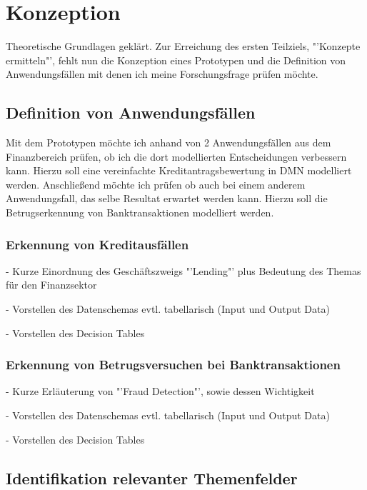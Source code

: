 \chapter{Konzeption}
\label{ch:Konzeption3}

Theoretische Grundlagen geklärt. Zur Erreichung des ersten Teilziels, "'Konzepte ermitteln"', fehlt nun die Konzeption eines Prototypen und die Definition von Anwendungsfällen mit denen ich meine Forschungsfrage prüfen möchte.

\section{Definition von Anwendungsfällen}
\label{sec:Anwendungsfalle3}

Mit dem Prototypen möchte ich anhand von 2 Anwendungsfällen aus dem Finanzbereich prüfen, ob ich die dort modellierten Entscheidungen verbessern kann. Hierzu soll eine vereinfachte Kreditantragsbewertung in DMN modelliert werden. Anschließend möchte ich prüfen ob auch bei einem anderem Anwendungsfall, das selbe Resultat erwartet werden kann. Hierzu soll die Betrugserkennung von Banktransaktionen modelliert werden.   

\subsection{Erkennung von Kreditausfällen}
\label{subsec:Kreditausfallen3}

- Kurze Einordnung des Geschäftszweigs "'Lending"' plus Bedeutung des Themas für den Finanzsektor

- Vorstellen des Datenschemas evtl. tabellarisch (Input und Output Data) 

- Vorstellen des Decision Tables

\subsection{Erkennung von Betrugsversuchen bei Banktransaktionen}
\label{subsec:Banktransaktionen3}

- Kurze Erläuterung von "'Fraud Detection"', sowie dessen Wichtigkeit

- Vorstellen des Datenschemas evtl. tabellarisch (Input und Output Data) 

- Vorstellen des Decision Tables

\section{Identifikation relevanter Themenfelder}
\label{subsec:Themenfelder3}

